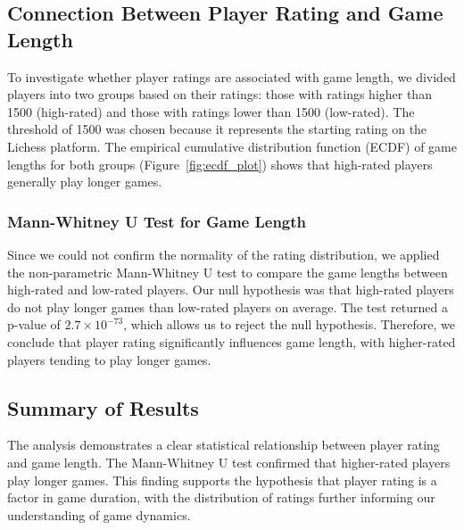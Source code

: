 \documentclass[conference]{IEEEtran}
\begin{document}
\subsection{Connection Between Player Rating and Game Length}
To investigate whether player ratings are associated with game length, we divided players into two groups based on their ratings: those with ratings higher than 1500 (high-rated) and those with ratings lower than 1500 (low-rated). The threshold of 1500 was chosen because it represents the starting rating on the Lichess platform. The empirical cumulative distribution function (ECDF) of game lengths for both groups (Figure~\ref{fig:ecdf_plot}) shows that high-rated players generally play longer games.

\subsubsection{Mann-Whitney U Test for Game Length}
Since we could not confirm the normality of the rating distribution, we applied the non-parametric Mann-Whitney U test to compare the game lengths between high-rated and low-rated players. Our null hypothesis was that high-rated players do not play longer games than low-rated players on average. The test returned a p-value of \(2.7 \times 10^{-73}\), which allows us to reject the null hypothesis. Therefore, we conclude that player rating significantly influences game length, with higher-rated players tending to play longer games.

\subsection{Summary of Results}
The analysis demonstrates a clear statistical relationship between player rating and game length. The Mann-Whitney U test confirmed that higher-rated players play longer games. This finding supports the hypothesis that player rating is a factor in game duration, with the distribution of ratings further informing our understanding of game dynamics.



\newpage


\end{document}
